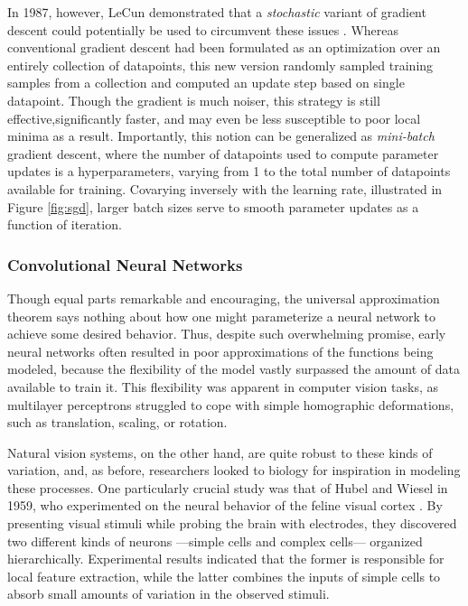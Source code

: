 In 1987, however, LeCun demonstrated that a \emph{stochastic} variant of gradient descent could potentially be used to circumvent these issues \cite{LeCun1987}.
Whereas conventional gradient descent had been formulated as an optimization over an entirely collection of datapoints, this new version randomly sampled training samples from a collection and computed an update step based on single datapoint.
Though the gradient is much noiser, this strategy is still effective,significantly faster, and may even be less susceptible to poor local minima as a result.
Importantly, this notion can be generalized as \emph{mini-batch} gradient descent, where the number of datapoints used to compute parameter updates is a hyperparameters, varying from 1 to the total number of datapoints available for training.
Covarying inversely with the learning rate, illustrated in Figure \ref{fig:sgd}, larger batch sizes serve to smooth parameter updates as a function of iteration.

\subsubsection{Convolutional Neural Networks}
\label{subsec:convnets}


Though equal parts remarkable and encouraging, the universal approximation theorem says nothing about how one might parameterize a neural network to achieve some desired behavior.
Thus, despite such overwhelming promise, early neural networks often resulted in poor approximations of the functions being modeled, because the flexibility of the model vastly surpassed the amount of data available to train it.
This flexibility was apparent in computer vision tasks, as multilayer perceptrons struggled to cope with simple homographic deformations, such as translation, scaling, or rotation.

Natural vision systems, on the other hand, are quite robust to these kinds of variation, and, as before, researchers looked to biology for inspiration in modeling these processes.
One particularly crucial study was that of Hubel and Wiesel in 1959, who experimented on the neural behavior of the feline visual cortex \cite{}.
By presenting visual stimuli while probing the brain with electrodes, they discovered two different kinds of neurons ---simple cells and complex cells--- organized hierarchically.
Experimental results indicated that the former is responsible for local feature extraction, while the latter combines the inputs of simple cells to absorb small amounts of variation in the observed stimuli.

